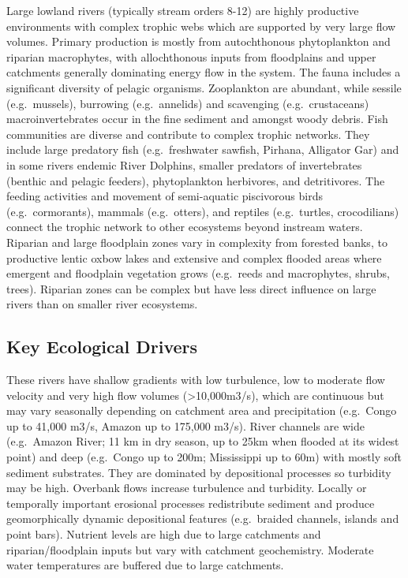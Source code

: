 \documentclass[
  letterpaper,
  DIV=11,
  numbers=noendperiod]{scrartcl}
\begin{document}
Large lowland rivers (typically stream orders 8-12) are highly
productive environments with complex trophic webs which are supported by
very large flow volumes. Primary production is mostly from autochthonous
phytoplankton and riparian macrophytes, with allochthonous inputs from
floodplains and upper catchments generally dominating energy flow in the
system. The fauna includes a significant diversity of pelagic organisms.
Zooplankton are abundant, while sessile (e.g.~mussels), burrowing
(e.g.~annelids) and scavenging (e.g.~crustaceans) macroinvertebrates
occur in the fine sediment and amongst woody debris. Fish communities
are diverse and contribute to complex trophic networks. They include
large predatory fish (e.g.~freshwater sawfish, Pirhana, Alligator Gar)
and in some rivers endemic River Dolphins, smaller predators of
invertebrates (benthic and pelagic feeders), phytoplankton herbivores,
and detritivores. The feeding activities and movement of semi-aquatic
piscivorous birds (e.g.~cormorants), mammals (e.g.~otters), and reptiles
(e.g.~turtles, crocodilians) connect the trophic network to other
ecosystems beyond instream waters. Riparian and large floodplain zones
vary in complexity from forested banks, to productive lentic oxbow lakes
and extensive and complex flooded areas where emergent and floodplain
vegetation grows (e.g.~reeds and macrophytes, shrubs, trees). Riparian
zones can be complex but have less direct influence on large rivers than
on smaller river ecosystems.

\subsection{Key Ecological Drivers}\label{key-ecological-drivers-6}

These rivers have shallow gradients with low turbulence, low to moderate
flow velocity and very high flow volumes (\textgreater10,000m3/s), which
are continuous but may vary seasonally depending on catchment area and
precipitation (e.g.~Congo up to 41,000 m3/s, Amazon up to 175,000 m3/s).
River channels are wide (e.g.~Amazon River; 11 km in dry season, up to
25km when flooded at its widest point) and deep (e.g.~Congo up to 200m;
Mississippi up to 60m) with mostly soft sediment substrates. They are
dominated by depositional processes so turbidity may be high. Overbank
flows increase turbulence and turbidity. Locally or temporally important
erosional processes redistribute sediment and produce geomorphically
dynamic depositional features (e.g.~braided channels, islands and point
bars). Nutrient levels are high due to large catchments and
riparian/floodplain inputs but vary with catchment geochemistry.
Moderate water temperatures are buffered due to large catchments.
\end{document}
